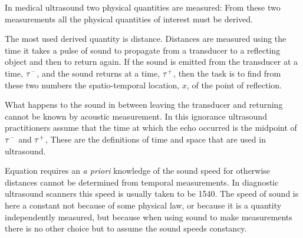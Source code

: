 In medical ultrasound two physical quantities are measured:
From these two measurements all the physical quantities of interest must be derived.

The most used derived quantity is distance.
Distances are measured using the time it takes a pulse of sound to propagate from a transducer
to a reflecting object and then to return again. 
If the sound is emitted from the transducer at a time, $\tau^-$,
and the sound returns at a time,  $\tau^+$,
then the task is to find from these two numbers the spatio-temporal location, $x$,
of the point of reflection.

What happens to the sound in between leaving the transducer and returning
cannot be known by acoustic measurement.
In this ignorance ultrasound practitioners assume that the time at which the echo 
occurred is the midpoint of $\tau^-$ and $\tau^+$,
These are the definitions of time and space that are used in ultrasound.



Equation  requires an {\em a priori} knowledge of the sound speed
for otherwise distances cannot be determined from temporal measurements.
In diagnostic ultrasound scanners this speed is usually taken to be \unit{1540}\metre\reciprocal\second.
The speed of sound is here a constant not because of some physical law, 
or because it is a quantity independently measured,
but because when using sound to make measurements 
there is no other choice  but to assume the sound speeds constancy. %

